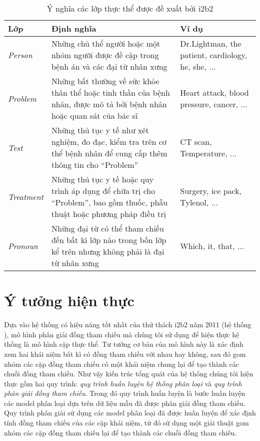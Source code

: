 \begin{table}[th]
\centering{}
\caption{Ý nghĩa các lớp thực thể được đề xuất bởi i2b2\label{tab:EntityLabels}}
\footnotesize\sffamily

\begin{tabularx}{\textwidth}{@{}lLP{\raggedright}{0.3}@{}}
\toprule
\textbf{Lớp} & \textbf{Định nghĩa} & \textbf{Ví dụ}\\
\midrule
\emph{Person} & Những chủ thể người hoặc một nhóm người được đề cập trong bệnh án và các đại từ nhân xưng & Dr.Lightman, the patient, cardiology, he, she, ...\\
\emph{Problem} & Những bất thường về sức khỏe thân thể hoặc tinh thần của bệnh nhân, được mô tả bởi bệnh nhân hoặc quan sát của bác sĩ & Heart attack, blood pressure, cancer, ...\\
\emph{Test} & Những thủ tục y tế như xét nghiệm, đo đạc, kiểm tra trên cơ thể bệnh nhân để cung cấp thêm thông tin cho ``Problem'' & CT scan, Temperature, ...\\
\emph{Treatment} & Những thủ tục y tế hoặc quy trình áp dụng để chữa trị cho ``Problem'', bao gồm thuốc, phẫu thuật hoặc phương pháp điều trị & Surgery, ice pack, Tylenol, ...\\
\emph{Pronoun} & Những đại từ có thể tham chiếu đến bất kì lớp nào trong bốn lớp kể trên nhưng không phải là đại từ nhân xưng & Which, it, that, ...\\
\bottomrule
\end{tabularx}
\end{table}

\section{Ý tưởng hiện thực\label{ytuonghienthuc}}
Dựa vào hệ thống có hiệu năng tốt nhất của thử thách i2b2 năm 2011 (hệ thống \cite{YanXu2012}), mô hình phân giải đồng tham chiếu mà chúng tôi sử dụng để hiện thực hệ thống là mô hình cặp thực thể. Tư tưởng cơ bản của mô hình này là xác định xem hai khái niệm bất kì có đồng tham chiếu với nhau hay không, sau đó gom nhóm các cặp đồng tham chiếu có một khái niệm chung lại để tạo thành các chuỗi đồng tham chiếu. Như vậy kiến trúc tổng quát của hệ thống chúng tôi hiện thực gồm hai quy trình: \emph{quy trình huấn luyện hệ thống phân loại} và \emph{quy trình phân giải đồng tham chiếu}. Trong đó quy trình huấn luyện là bước huấn luyện các model phân loại dựa trên dữ liệu mẫu đã được phân giải đồng tham chiếu. Quy trình phân giải sử dụng các model phân loại đã được huấn luyện để xác định tính đồng tham chiếu của các cặp khái niệm, từ đó sử dụng một giải thuật gom nhóm các cặp đồng tham chiếu lại để tạo thành các chuỗi đồng tham chiếu.

